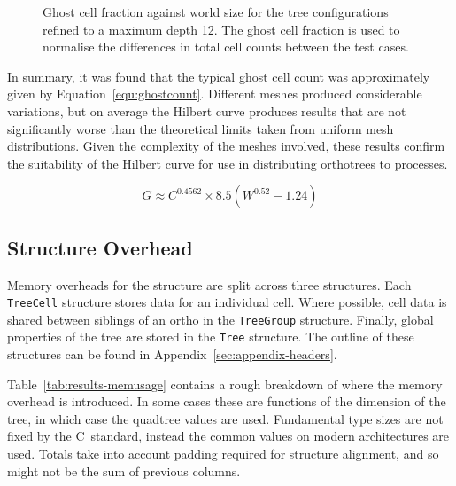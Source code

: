 \documentclass[twoside]{IIBproject}
\def\CC{{C\nolinebreak[4]\hspace{-.05em}\raisebox{.4ex}{\tiny\bf ++}}}
\numberwithin{figure}{section}
\begin{document}
        \tikzset{external/export next=false}
        \begin{figure}[H]
            \centering
            
            \caption{Ghost cell fraction against world size for the tree configurations refined to a maximum depth 12. The ghost cell fraction is used to normalise the differences in total cell counts between the test cases.}
            \label{fig:anal-borderworldsize}
        \end{figure}

        In summary, it was found that the typical ghost cell count was approximately given by Equation~\ref{equ:ghostcount}. Different meshes produced considerable variations, but on average the Hilbert curve produces results that are not significantly worse than the theoretical limits taken from uniform mesh distributions. Given the complexity of the meshes involved, these results confirm the suitability of the Hilbert curve for use in distributing orthotrees to processes.

        \begin{equation}
            G \approx C^{0.4562} \times 8.5(W^{0.52}-1.24)
            \label{equ:ghostcount}
        \end{equation}



    \subsection{Structure Overhead} %
        \label{sec:results-memoryuse}

        Memory overheads for the structure are split across three structures. Each \texttt{TreeCell} structure stores data for an individual cell. Where possible, cell data is shared between siblings of an ortho in the \texttt{TreeGroup} structure. Finally, global properties of the tree are stored in the \texttt{Tree} structure. The outline of these structures can be found in Appendix~\ref{sec:appendix-headers}.

        Table~\ref{tab:results-memusage} contains a rough breakdown of where the memory overhead is introduced. In some cases these are functions of the dimension of the tree, in which case the quadtree values are used. Fundamental type sizes are not fixed by the \CC~standard, instead the common values on modern architectures are used. Totals take into account padding required for structure alignment, and so might not be the sum of previous columns.
\end{document}
